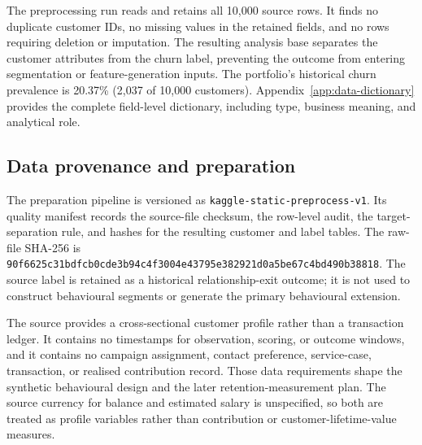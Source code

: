 \documentclass[a4paper,12pt]{article}
\begin{document}
The preprocessing run reads and retains all 10,000 source rows. It finds no duplicate customer IDs, no missing values in the retained fields, and no rows requiring deletion or imputation. The resulting analysis base separates the customer attributes from the churn label, preventing the outcome from entering segmentation or feature-generation inputs. The portfolio's historical churn prevalence is 20.37\% (2,037 of 10,000 customers). Appendix~\ref{app:data-dictionary} provides the complete field-level dictionary, including type, business meaning, and analytical role.

\subsection{Data provenance and preparation}

The preparation pipeline is versioned as \texttt{kaggle-static-preprocess-v1}. Its quality manifest records the source-file checksum, the row-level audit, the target-separation rule, and hashes for the resulting customer and label tables. The raw-file SHA-256 is \texttt{90f6625c31bdfcb0cde3b94c4f3004e43795e382921d0a5be67c4bd490b38818}. The source label is retained as a historical relationship-exit outcome; it is not used to construct behavioural segments or generate the primary behavioural extension.

The source provides a cross-sectional customer profile rather than a transaction ledger. It contains no timestamps for observation, scoring, or outcome windows, and it contains no campaign assignment, contact preference, service-case, transaction, or realised contribution record. Those data requirements shape the synthetic behavioural design and the later retention-measurement plan. The source currency for balance and estimated salary is unspecified, so both are treated as profile variables rather than contribution or customer-lifetime-value measures.
\end{document}
